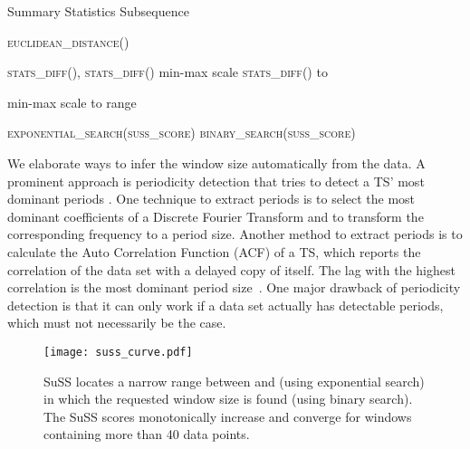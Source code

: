 \documentclass[pdflatex,sn-basic]{sn-jnl}
\begin{document}
\begin{algorithm}[t]
	\caption{Summary Statistics Subsequence}\label{alg:suss}
	\begin{algorithmic}[1]
			\State 
		    \State  \textsc{euclidean\_distance}()
		    \State \Return{}
		\EndProcedure
		
			\State  \textsc{stats\_diff()}, \textsc{stats\_diff()}
			\State  min-max scale \textsc{stats\_diff()} to 
			\State \Return{}
		\EndProcedure
		
			\State  min-max scale  to range 
			\State  
			
			\State  \textsc{exponential\_search(\textsc{suss\_score})}
			\State  \textsc{binary\_search}(\textsc{suss\_score})
			\State \Return{}
		\EndProcedure
	\end{algorithmic}
\end{algorithm}

We elaborate ways to infer the window size automatically from the data. A prominent approach is periodicity detection that tries to detect a TS' most dominant periods \citep{Elfeky2005PeriodicityDI}. One technique to extract periods is to select the most dominant coefficients of a Discrete Fourier Transform and to transform the corresponding frequency to a period size. Another method to extract periods is to calculate the Auto Correlation Function (ACF) of a TS, which reports the correlation of the data set with a delayed copy of itself. The lag with the highest correlation is the most dominant period size~\citep{Vlachos2005OnPD, Wen2021RobustPeriodRT}. One major drawback of periodicity detection is that it can only work if a data set actually has detectable periods, which must not necessarily be the case.

\begin{figure}[t]
	\texttt{[image: suss\_curve.pdf]}
	\caption{SuSS locates a narrow range between  and  (using exponential search) in which the requested window size  is found (using binary search). The SuSS scores  monotonically increase and converge for windows containing more than 40 data points. \label{fig:SuSS_curve}
	}
\end{figure}
\end{document}
